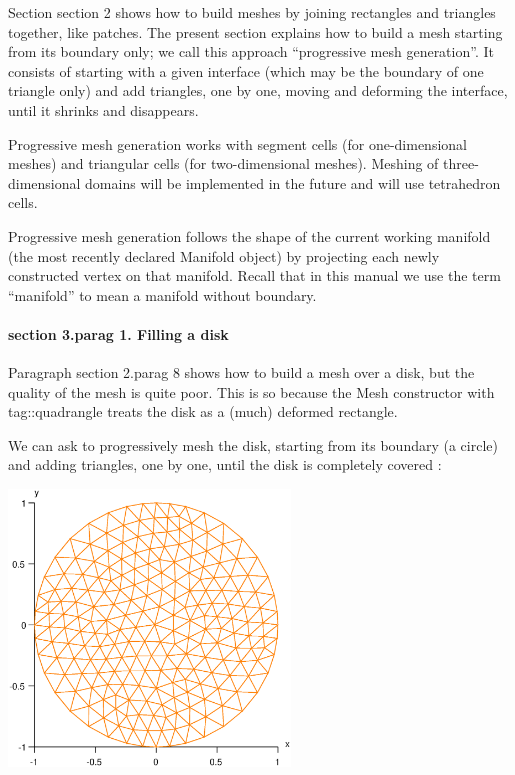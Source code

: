 Section \numb section 2 shows how to build meshes by joining rectangles and triangles together,
like patches.
The present section explains how to build a mesh starting from its boundary only;
we call this approach ``progressive mesh generation''.
It consists of starting with a given interface (which may be the boundary of one triangle only)
and add triangles, one by one, moving and deforming the interface, until it shrinks and
disappears.

Progressive mesh generation works with segment cells (for one-dimensional meshes) and
triangular cells (for two-dimensional meshes).
Meshing of three-dimensional domains will be implemented in the future and will use tetrahedron
cells.

Progressive mesh generation follows the shape of the current working manifold (the most recently
declared {\codett Manifold} object) by {\codett project}ing each newly constructed vertex
on that manifold.
Recall that in this manual we use the term ``manifold'' to mean a manifold without boundary.


\paragraph{\numb section 3.\numb parag 1. Filling a disk}

Paragraph \numb section 2.\numb parag 8 shows how to build a mesh over a disk,
but the quality of the mesh is quite poor.
This is so because the {\codett Mesh} constructor with {\codett tag::quadrangle} treats the
disk as a (much) deformed rectangle.

We can ask {\maniFEM} to progressively mesh the disk, starting from its boundary (a circle)
and adding triangles, one by one, until the disk is completely covered :

\centerline{\includegraphics[width=75mm]{disk-with-tri.eps}}


